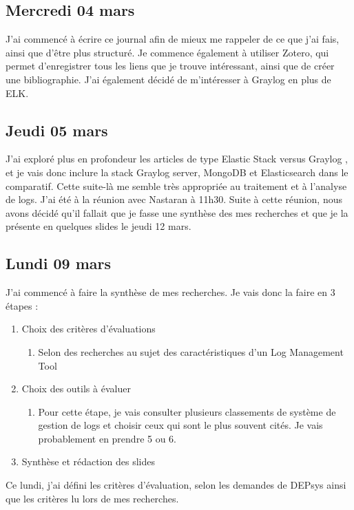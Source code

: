 \documentclass[paper=a4, fontsize=11pt]{scrartcl}
\begin{document}
\subsection{Mercredi 04 mars}
    J'ai commencé à écrire ce journal afin de mieux me rappeler de ce que j'ai fais, ainsi que d'être plus structuré. Je commence également à utiliser Zotero, qui permet d'enregistrer tous les liens que je trouve intéressant, ainsi que de créer une bibliographie. J'ai également décidé de m'intéresser à Graylog en plus de ELK.
\subsection{Jeudi 05 mars}
    J'ai exploré plus en profondeur les articles de type \og Elastic Stack versus Graylog \fg, et je vais donc inclure la stack \og Graylog server, MongoDB et Elasticsearch \fg dans le comparatif. Cette suite-là me semble très appropriée au traitement et à l'analyse de logs.
    J'ai été à la réunion avec Nastaran à 11h30. Suite à cette réunion, nous avons décidé qu'il fallait que je fasse une synthèse des mes recherches et que je la présente en quelques slides le jeudi 12 mars.
\subsection{Lundi 09 mars}
    J'ai commencé à faire la synthèse de mes recherches. Je vais donc la faire en 3 étapes :
    \begin{enumerate}
    \item Choix des critères d'évaluations
        \begin{enumerate}
            \item Selon des recherches au sujet des caractéristiques d'un \og Log Management Tool \fg
        \end{enumerate}
    \item Choix des outils à évaluer
        \begin{enumerate}
                \item Pour cette étape, je vais consulter plusieurs classements de système de gestion de logs et choisir ceux qui sont le plus souvent cités. Je vais probablement en prendre 5 ou 6.
        \end{enumerate}
    \item Synthèse et rédaction des slides
    \end{enumerate}
    Ce lundi, j'ai défini les critères d'évaluation, selon les demandes de DEPsys ainsi que les critères lu lors de mes recherches.
\end{document}
